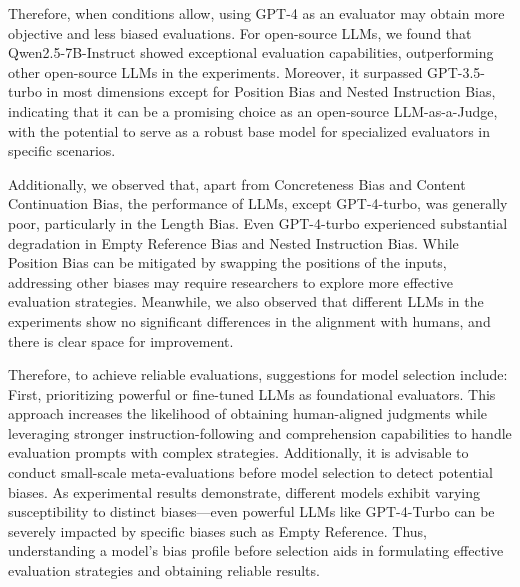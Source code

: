 \documentclass[acmsmall,screen]{acmart}
\begin{document}



% 

Therefore, when conditions allow, using GPT-4 as an evaluator may obtain more objective and less biased evaluations. 
For open-source LLMs, we found that Qwen2.5-7B-Instruct showed exceptional evaluation capabilities, outperforming other open-source LLMs in the experiments. 
Moreover, it surpassed GPT-3.5-turbo in most dimensions except for Position Bias and Nested Instruction Bias, indicating that it can be a promising choice as an open-source LLM-as-a-Judge, with the potential to serve as a robust base model for specialized evaluators in specific scenarios.

Additionally, we observed that, apart from Concreteness Bias and Content Continuation Bias, the performance of LLMs, except GPT-4-turbo, was generally poor, particularly in the Length Bias. 
Even GPT-4-turbo experienced substantial degradation in Empty Reference Bias and Nested Instruction Bias. 
While Position Bias can be mitigated by swapping the positions of the inputs, addressing other biases may require researchers to explore more effective evaluation strategies. 
Meanwhile, we also observed that different LLMs in the experiments show no significant differences in the alignment with humans, and there is clear space for improvement.

Therefore, to achieve reliable evaluations, suggestions for model selection include: First, prioritizing powerful or fine-tuned LLMs as foundational evaluators. This approach increases the likelihood of obtaining human-aligned judgments while leveraging stronger instruction-following and comprehension capabilities to handle evaluation prompts with complex strategies. Additionally, it is advisable to conduct small-scale meta-evaluations before model selection to detect potential biases. As experimental results demonstrate, different models exhibit varying susceptibility to distinct biases—even powerful LLMs like GPT-4-Turbo can be severely impacted by specific biases such as Empty Reference. Thus, understanding a model's bias profile before selection aids in formulating effective evaluation strategies and obtaining reliable results.
\end{document}

